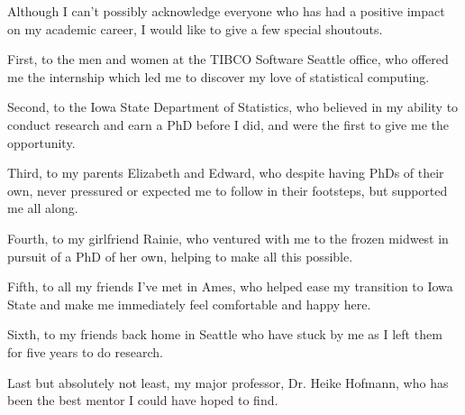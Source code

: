 
Although I can't possibly acknowledge everyone who has had a positive impact on my academic career, I would like to give a few special shoutouts.

First, to the men and women at the TIBCO Software Seattle office, who offered me the internship which led me to discover my love of statistical computing.

Second, to the Iowa State Department of Statistics, who believed in my ability to conduct research and earn a PhD before I did, and were the first to give me the opportunity.

Third, to my parents Elizabeth and Edward, who despite having PhDs of their own, never pressured or expected me to follow in their footsteps, but supported me all along.

Fourth, to my girlfriend Rainie, who ventured with me to the frozen midwest in pursuit of a PhD of her own, helping to make all this possible.

Fifth, to all my friends I've met in Ames,  who helped ease my transition to Iowa State and make me immediately feel comfortable and happy here.

Sixth, to my friends back home in Seattle who have stuck by me as I left them for five years to do research.

Last but absolutely not least, my major professor, Dr. Heike Hofmann, who has been the best mentor I could have hoped to find.

